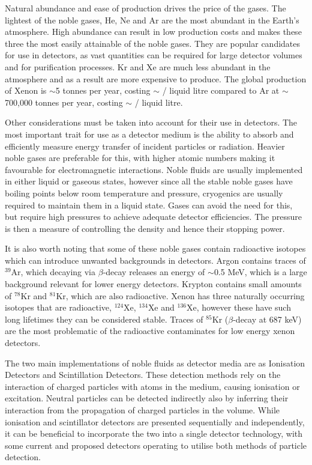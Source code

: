 Natural abundance and ease of production drives the price of the gases. The lightest of the noble gases, He, Ne and Ar are the most abundant in the Earth's atmosphere. High abundance can result in low production costs and makes these three the most easily attainable of the noble gases. They are popular candidates for use in detectors, as vast quantities can be required for large detector volumes and for purification processes. Kr and Xe are much less abundant in the atmosphere and as a result are more expensive to produce. The global production of Xenon is $\sim$5 tonnes per year\cite{xenonProduction}, costing $\sim$ / liquid litre compared to Ar at $\sim$700,000 tonnes per year\cite{argonProduction}, costing $\sim$ / liquid litre.

Other considerations must be taken into account for their use in detectors. The most important trait for use as a detector medium is the ability to absorb and efficiently measure energy transfer of incident particles or radiation. Heavier noble gases are preferable for this, with higher atomic numbers making it favourable for electromagnetic interactions. Noble fluids are usually implemented in either liquid or gaseous states, however since all the stable noble gases have boiling points below room temperature and pressure, cryogenics are usually required to maintain them in a liquid state. Gases can avoid the need for this, but require high pressures to achieve adequate detector efficiencies. The pressure is then a measure of controlling the density and hence their stopping power.

It is also worth noting that some of these noble gases contain radioactive isotopes which can introduce unwanted backgrounds in detectors. Argon contains traces of $^{39}$Ar, which decaying via $\beta$-decay releases an energy of $\sim$0.5 MeV, which is a large background relevant for lower energy detectors. Krypton contains small amounts of $^{78}$Kr and $^{81}$Kr, which are also radioactive. Xenon has three naturally occurring isotopes that are radioactive, $^{124}$Xe, $^{134}$Xe and $^{136}$Xe, however these have such long lifetimes they can be considered stable. Traces of $^{85}$Kr ($\beta$-decay at 687 keV) are the most problematic of the radioactive contaminates for low energy xenon detectors.

The two main implementations of noble fluids as detector media are as Ionisation Detectors and Scintillation Detectors. These detection methods rely on the interaction of charged particles with atoms in the medium, causing ionisation or excitation. Neutral particles can be detected indirectly also by inferring their interaction from the propagation of charged particles in the volume. While ionisation and scintillator detectors are presented sequentially and independently, it can be beneficial to incorporate the two into a single detector technology, with some current and proposed detectors operating to utilise both methods of particle detection.
    

